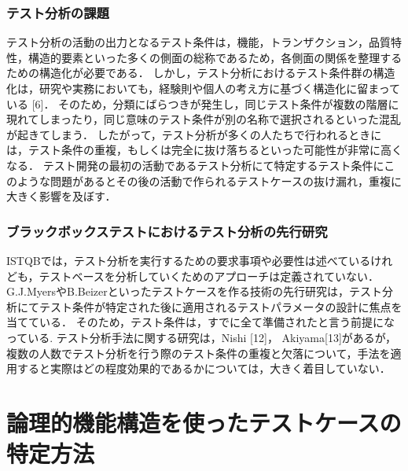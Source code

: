 \documentclass[10pt,a4j]{jarticle}
\begin{document}
\subsubsection{テスト分析の課題}
テスト分析の活動の出力となるテスト条件は，機能，トランザクション，品質特性，構造的要素といった多くの側面の総称であるため，各側面の関係を整理するための構造化が必要である．
しかし，テスト分析におけるテスト条件群の構造化は，研究や実務においても，経験則や個人の考え方に基づく構造化に留まっている [6]．
そのため，分類にばらつきが発生し，同じテスト条件が複数の階層に現れてしまったり，同じ意味のテスト条件が別の名称で選択されるといった混乱が起きてしまう．
したがって，テスト分析が多くの人たちで行われるときには，テスト条件の重複，もしくは完全に抜け落ちるといった可能性が非常に高くなる．
テスト開発の最初の活動であるテスト分析にて特定するテスト条件にこのような問題があるとその後の活動で作られるテストケースの抜け漏れ，重複に大きく影響を及ぼす．

\subsubsection{ブラックボックステストにおけるテスト分析の先行研究}
ISTQBでは，テスト分析を実行するための要求事項や必要性は述べているけれども，テストベースを分析していくためのアプローチは定義されていない．
G.J.MyersやB.Beizerといったテストケースを作る技術の先行研究は，テスト分析にてテスト条件が特定された後に適用されるテストパラメータの設計に焦点を当てている．
そのため，テスト条件は，すでに全て準備されたと言う前提になっている.
テスト分析手法に関する研究は，Nishi [12]， Akiyama[13]があるが，複数の人数でテスト分析を行う際のテスト条件の重複と欠落について，手法を適用すると実際はどの程度効果的であるかについては，大きく着目していない．

\section{論理的機能構造を使ったテストケースの特定方法}\label{chap:3}
\end{document}
